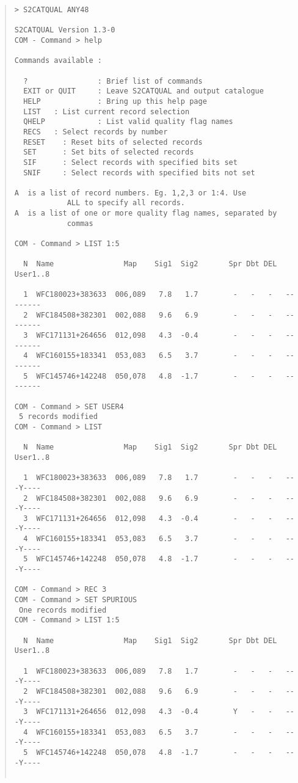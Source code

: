 \documentclass{book}
\renewcommand{\_}{{\tt\char'137}}     %
\begin{document}
\begin{quote}\begin{verbatim}
> S2CATQUAL ANY48
 
S2CATQUAL Version 1.3-0
COM - Command > help
 
Commands available :
 
  ?                : Brief list of commands
  EXIT or QUIT     : Leave S2CATQUAL and output catalogue
  HELP             : Bring up this help page
  LIST   : List current record selection
  QHELP            : List valid quality flag names
  RECS   : Select records by number
  RESET    : Reset bits of selected records
  SET      : Set bits of selected records
  SIF      : Select records with specified bits set
  SNIF     : Select records with specified bits not set
 
A  is a list of record numbers. Eg. 1,2,3 or 1:4. Use
            ALL to specify all records.
A  is a list of one or more quality flag names, separated by
            commas
 
COM - Command > LIST 1:5
 
  N  Name                Map    Sig1  Sig2       Spr Dbt DEL  User1..8
 
  1  WFC180023+383633  006,089   7.8   1.7        -   -   -   --------
  2  WFC184508+382301  002,088   9.6   6.9        -   -   -   --------
  3  WFC171131+264656  012,098   4.3  -0.4        -   -   -   --------
  4  WFC160155+183341  053,083   6.5   3.7        -   -   -   --------
  5  WFC145746+142248  050,078   4.8  -1.7        -   -   -   --------
 
COM - Command > SET USER4
 5 records modified
COM - Command > LIST
 
  N  Name                Map    Sig1  Sig2       Spr Dbt DEL  User1..8
 
  1  WFC180023+383633  006,089   7.8   1.7        -   -   -   ---Y----
  2  WFC184508+382301  002,088   9.6   6.9        -   -   -   ---Y----
  3  WFC171131+264656  012,098   4.3  -0.4        -   -   -   ---Y----
  4  WFC160155+183341  053,083   6.5   3.7        -   -   -   ---Y----
  5  WFC145746+142248  050,078   4.8  -1.7        -   -   -   ---Y----
 
COM - Command > REC 3
COM - Command > SET SPURIOUS
 One records modified
COM - Command > LIST 1:5
 
  N  Name                Map    Sig1  Sig2       Spr Dbt DEL  User1..8
 
  1  WFC180023+383633  006,089   7.8   1.7        -   -   -   ---Y----
  2  WFC184508+382301  002,088   9.6   6.9        -   -   -   ---Y----
  3  WFC171131+264656  012,098   4.3  -0.4        Y   -   -   ---Y----
  4  WFC160155+183341  053,083   6.5   3.7        -   -   -   ---Y----
  5  WFC145746+142248  050,078   4.8  -1.7        -   -   -   ---Y----
 

\end{verbatim}
\end{quote}
\end{document}
